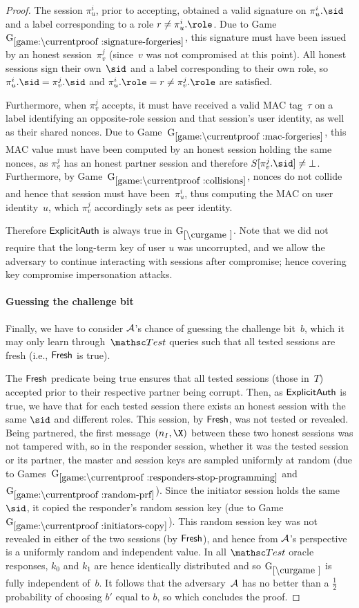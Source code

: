 \begin{proof}
The session $\pi_u^i$, prior to accepting, obtained a valid signature on $\pi^i_u.\sid$ and a label corresponding to a role $r \neq \pi_u^i.\role$. Due to Game~$\lblGm{signature-forgeries}$,  this signature must have been issued by an honest session~$\pi_v^j$ (since~$v$ was not compromised at this point).
All honest sessions sign their own~$\sid$ and a label corresponding to their own role, so $\pi_u^i.\sid = \pi_v^j.\sid$ and $\pi_u^i.\role = r \neq \pi_v^j.\role$ are satisfied.

Furthermore, when $\pi_v^j$ accepts, it must have received a valid MAC tag~$\tau$ on a label identifying an opposite-role session and that session's user identity, as well as their shared nonces.
Due to Game~$\lblGm{mac-forgeries}$, this MAC value must have been computed by an honest session holding the same nonces, as $\pi_v^j$ has an honest partner session and therefore $\S[\pi_v^j.\sid] \neq \bot$. 
Furthermore, by Game~$\lblGm{collisions}$, nonces do not collide and hence that session must have been~$\pi_u^i$, thus computing the MAC on user identity~$u$, which $\pi_v^j$ accordingly sets as peer identity.

Therefore $\mathsf{ExplicitAuth}$ is always true in $\curGm$.
Note that we did not require that the long-term key of user $u$ was uncorrupted, and we allow the adversary to continue interacting with sessions after compromise; hence covering key compromise impersonation attacks.


\paragraph{Guessing the challenge bit}

Finally, we have to consider $\mathcal{A}$'s chance of guessing the challenge bit~$b$,
which it may only learn through~$\Test$ queries such that all tested sessions are fresh (i.e., $\mathsf{Fresh}$ is true).

The $\mathsf{Fresh}$ predicate being true ensures that all tested sessions (those in~$T$) accepted prior to their respective partner being corrupt.
Then, as $\mathsf{ExplicitAuth}$ is true, we have that for each tested session there exists an honest session with the same $\sid$ and different roles.
This session, by $\mathsf{Fresh}$, was not tested or revealed.
Being partnered, the first message~$(\nonce_I, \X)$ between these two honest sessions was not tampered with,
so in the responder session, whether it was the tested session or its partner, the master and session keys are sampled uniformly at random (due to Games~$\lblGm{responders-stop-programming}$ and~$\lblGm{random-prf}$).
Since the initiator session holds the same~$\sid$, it copied the responder's random session key (due to Game~$\lblGm{initiators-copy}$).
This random session key was not revealed in either of the two sessions (by $\mathsf{Fresh}$),
and hence from $\mathcal{A}$'s perspective is a uniformly random and independent value.
In all $\Test$ oracle responses, $k_0$ and $k_1$ are hence identically distributed and so $\curGm$ is fully independent of~$b$.
It follows that the adversary~$\mathcal{A}$ has no better than a $\frac{1}{2}$ probability of choosing $b'$ equal to $b$,
so
which concludes the proof.
\end{proof}

